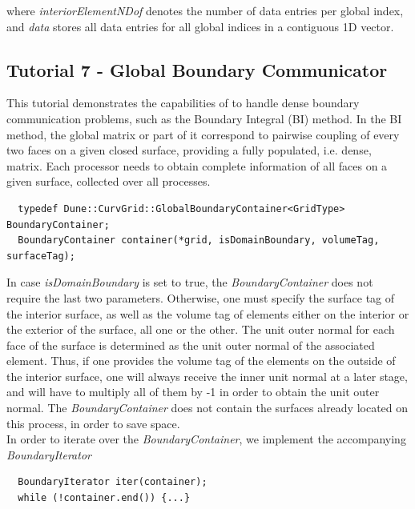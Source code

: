 \noindent
where \textit{interiorElementNDof} denotes the number of data entries per global index, and \textit{data} stores all data entries for all global indices in a contiguous 1D vector. \\


\subsection{Tutorial 7 - Global Boundary Communicator}
\label{usage-howto-tutorial-globalboundarycommunicator}

\noindent
This tutorial demonstrates the capabilities of \curvgrid{} to handle dense boundary communication problems, such as the Boundary Integral (BI) method. In the BI method, the global matrix or part of it correspond to pairwise coupling of every two faces on a given closed surface, providing a fully populated, i.e. dense, matrix. Each processor needs to obtain complete information of all faces on a given surface, collected over all processes.

\begin{mybox}
\begin{lstlisting}
  typedef Dune::CurvGrid::GlobalBoundaryContainer<GridType> BoundaryContainer;
  BoundaryContainer container(*grid, isDomainBoundary, volumeTag, surfaceTag);
\end{lstlisting}
\end{mybox}

\noindent
In case \textit{isDomainBoundary} is set to true, the \textit{BoundaryContainer} does not require the last two parameters. Otherwise, one must specify the surface tag of the interior surface, as well as the volume tag of elements either on the interior or the exterior of the surface, all one or the other. The unit outer normal for each face of the surface is determined as the unit outer normal of the associated element. Thus, if one provides the volume tag of the elements on the outside of the interior surface, one will always receive the inner unit normal at a later stage, and will have to multiply all of them by -1 in order to obtain the unit outer normal. The \textit{BoundaryContainer} does not contain the surfaces already located on this process, in order to save space.  \\

\noindent
In order to iterate over the \textit{BoundaryContainer}, we implement the accompanying \textit{BoundaryIterator}

\begin{mybox}
\begin{lstlisting}
  BoundaryIterator iter(container);
  while (!container.end()) {...}
\end{lstlisting}
\end{mybox}

